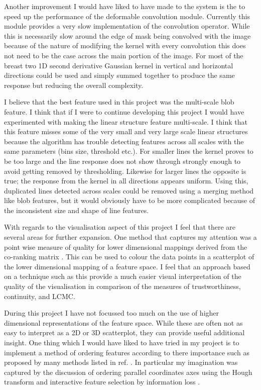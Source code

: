 Another improvement I would have liked to have made to the system is the to speed up the performance of the deformable convolution module. Currently this module provides a very slow implementation of the convolution operator. While this is necessarily slow around the edge of mask being convolved with the image because of the nature of modifying the kernel with every convolution this does not need to be the case across the main portion of the image. For most of the breast two 1D second derivative Gaussian kernel in vertical and horizontal directions could be used and simply summed together to produce the same response but reducing the overall complexity.

I believe that the best feature used in this project was the multi-scale blob feature. I think that if I were to continue developing this project I would have experimented with making the linear structure feature multi-scale. I think that this feature misses some of the very small and very large scale linear structures because the algorithm has trouble detecting features across all scales with the same parameters (bins size, threshold etc.). For smaller lines the kernel proves to be too large and the line response does not show through strongly enough to avoid getting removed by thresholding. Likewise for larger lines the opposite is true; the response from the kernel in all directions appears uniform. Using this, duplicated lines detected across scales could be removed using a merging method like blob features, but it would obviously have to be more complicated because of the inconsistent size and shape of line features.

With regards to the visualisation aspect of this project I feel that there are several areas for further expansion. One method that captures my attention was a point wise measure of quality for lower dimensional mappings derived from the co-ranking matrix \cite{mokbel2013visualizing}. This can be used to colour the data points in a scatterplot of the lower dimensional mapping of a feature space. I feel that an approach based on a technique such as this provide a much easier visual interpretation of the quality of the visualisation in comparison of the measures of trustworthiness, continuity, and LCMC.

During this project I have not focussed too much on the use of higher dimensional representations of the feature space. While these are often not as easy to interpret as a 2D or 3D scatterplot, they can provide useful additional insight. One thing which I would have liked to have tried in my project is to implement a method of ordering features according to there importance such as proposed by many methods listed in ref. \cite{bertini2011quality}. In particular my imagination was captured by the discussion of ordering parallel coordinates axes using the Hough transform \cite{tatu2009combining} and interactive feature selection by information loss \cite{johansson2009interactive}.

